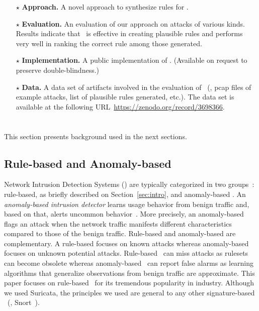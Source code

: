 \documentclass[sigconf,review, anonymous]{acmart}
\begin{document}
\newcommand{\Contrib}[1]{$\star$#1}
\begin{itemize}[topsep=.2ex,itemsep=.2ex,leftmargin=0.8em]

\item[\Contrib{}]\textbf{Approach.} A novel approach to synthesize
  rules for \nids.

\item[\Contrib{}]\textbf{Evaluation.} An evaluation of our approach on
  attacks of various kinds. Results indicate that \tname\ is effective
  in creating plausible rules and performs very well in ranking the
  correct rule among those generated.

\item[\Contrib{}]\textbf{Implementation.} A public implementation of
  \tname. (Available on request to preserve double-blindness.)

\item[\Contrib{}]\textbf{Data.} A data set of artifacts involved in
  the evaluation of \tname\ (\eg{}, pcap files of example attacks, list
  of plausible rules generated, etc.). The data set is available at
  the following URL~\url{https://zenodo.org/record/3698366}.
  
\end{itemize}


\section{\nids}
\label{sec:background}

This section presents background used in the next sections.

\subsection{Rule-based and Anomaly-based \nids}

\sloppy Network Intrusion Detection Systems (\nids{}) are typically categorized in two
groups~\cite{kumar2007survey}: rule-based, as briefly described on
Section~\ref{sec:intro}, and anomaly-based \nids. An
\emph{anomaly-based intrusion detector} learns usage behavior from
benign traffic and, based on that, alerts uncommon
behavior~\cite{7579764,kumar2007survey,Mitchell:2014:SID:2597757.2542049,cordy-etal-issta19}. More
precisely, an anomaly-based \nids{} flags an attack when the network
traffic manifests different characteristics compared to those of the
benign traffic. Rule-based \nids{} and anomaly-based \nids{} are
complementary. A rule-based \nids{} focuses on known attacks whereas
anomaly-based \nids{} focuses on unknown potential attacks. Rule-based
\nids\ can miss attacks as rulesets can become obsolete whereas
anomaly-based \nids\ can report false alarms as learning algorithms
that generalize observations from benign traffic are approximate.
This paper focuses on rule-based \nids\ for its tremendous popularity
in industry. Although we used Suricata, the
principles we used are general to any other signature-based
\nids~(\eg{}, Snort~\cite{snort}).
\end{document}
